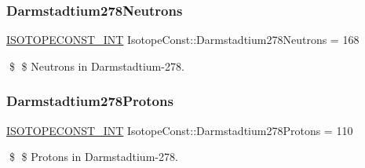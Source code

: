 \subsubsection{\texorpdfstring{Darmstadtium278\+Neutrons}{Darmstadtium278Neutrons}}
{\footnotesize\ttfamily \mbox{\hyperlink{group___isotope_const-_macros_ga5f18360b3e99483a35c32d789e62621c}{I\+S\+O\+T\+O\+P\+E\+C\+O\+N\+S\+T\+\_\+\+I\+NT}} Isotope\+Const\+::\+Darmstadtium278\+Neutrons = 168}

\$ \$ Neutrons in Darmstadtium-\/278. \mbox{\label{group___isotope_const-_darmstadtium-_ds278_gaab290d30d01f234f65a54f5af800bc87}} 
\subsubsection{\texorpdfstring{Darmstadtium278\+Protons}{Darmstadtium278Protons}}
{\footnotesize\ttfamily \mbox{\hyperlink{group___isotope_const-_macros_ga5f18360b3e99483a35c32d789e62621c}{I\+S\+O\+T\+O\+P\+E\+C\+O\+N\+S\+T\+\_\+\+I\+NT}} Isotope\+Const\+::\+Darmstadtium278\+Protons = 110}

\$ \$ Protons in Darmstadtium-\/278. 